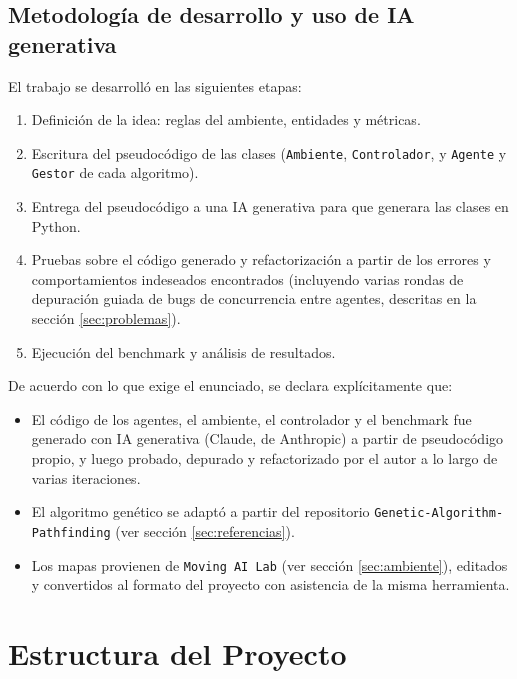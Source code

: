 \documentclass[11pt,a4paper]{article}
\begin{document}
\subsection{Metodología de desarrollo y uso de IA generativa}
El trabajo se desarrolló en las siguientes etapas:
\begin{enumerate}
    \item Definición de la idea: reglas del ambiente, entidades y métricas.
    \item Escritura del pseudocódigo de las clases (\texttt{Ambiente}, \texttt{Controlador}, y \texttt{Agente} y \texttt{Gestor} de cada algoritmo).
    \item Entrega del pseudocódigo a una IA generativa para que generara las clases en Python.
    \item Pruebas sobre el código generado y refactorización a partir de los errores y comportamientos indeseados encontrados (incluyendo varias rondas de depuración guiada de bugs de concurrencia entre agentes, descritas en la sección \ref{sec:problemas}).
    \item Ejecución del benchmark y análisis de resultados.
\end{enumerate}

De acuerdo con lo que exige el enunciado, se declara explícitamente que:
\begin{itemize}
    \item El código de los agentes, el ambiente, el controlador y el benchmark fue generado con IA generativa (Claude, de Anthropic) a partir de pseudocódigo propio, y luego probado, depurado y refactorizado por el autor a lo largo de varias iteraciones.
    \item El algoritmo genético se adaptó a partir del repositorio \texttt{Genetic-Algorithm-Pathfinding} (ver sección \ref{sec:referencias}).
    \item Los mapas provienen de \texttt{Moving AI Lab} (ver sección \ref{sec:ambiente}), editados y convertidos al formato del proyecto con asistencia de la misma herramienta.
\end{itemize}

\section{Estructura del Proyecto}
\end{document}
